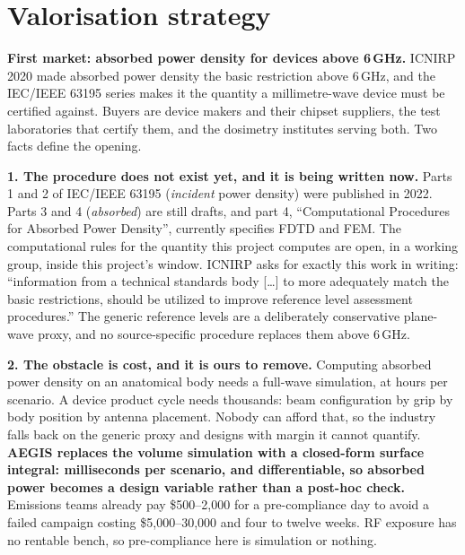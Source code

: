 \documentclass[10pt,a4paper]{article}
\begin{document}
\section{Valorisation strategy}

\textbf{First market: absorbed power density for devices above 6\,GHz.} ICNIRP 2020 made absorbed power density the basic
restriction above 6\,GHz, and the IEC/IEEE 63195 series makes it the quantity a millimetre-wave device must be certified
against. Buyers are device makers and their chipset suppliers, the test laboratories that certify them, and the dosimetry
institutes serving both. Two facts define the opening.

\textbf{1. The procedure does not exist yet, and it is being written now.} Parts 1 and 2 of IEC/IEEE 63195 (\emph{incident} power
density) were published in 2022. Parts 3 and 4 (\emph{absorbed}) are still drafts, and part 4, ``Computational Procedures for Absorbed Power Density'', currently specifies FDTD and FEM. The computational
rules for the quantity this project computes are open, in a working group, inside this project's window.
ICNIRP asks for exactly this work in writing: ``information from a technical standards body [\ldots] to more adequately
match the basic restrictions, should be utilized to improve reference level assessment procedures.'' The generic reference levels are a deliberately conservative plane-wave
proxy, and no source-specific procedure replaces them above 6\,GHz.

\textbf{2. The obstacle is cost, and it is ours to remove.} Computing absorbed power density on an anatomical body needs a
full-wave simulation, at hours per scenario. A device product cycle needs thousands: beam configuration by grip by body
position by antenna placement. Nobody can afford that, so the industry falls back on the generic proxy and designs with
margin it cannot quantify. \textbf{AEGIS replaces the volume simulation with a closed-form surface integral: milliseconds per
scenario, and differentiable, so absorbed power becomes a design variable rather than a post-hoc check.} Emissions teams already pay \$500--2{,}000 for a pre-compliance
day to avoid a failed campaign costing \$5{,}000--30{,}000 and four to twelve weeks. RF exposure has no rentable bench, so
pre-compliance here is simulation or nothing.
\end{document}
